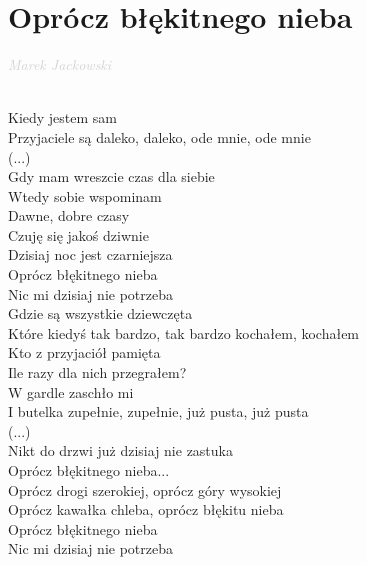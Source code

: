 \documentclass[a5paper, 10pt]{book}
\begin{document}
\section{Oprócz błękitnego nieba}\textcolor{lightgray}{\textit{Marek Jackowski}}\\~\\
\begin{minipage}[t]{0.8\textwidth}
Kiedy jestem sam\\
Przyjaciele są daleko, daleko, ode mnie, ode mnie\\
(...)~\\
Gdy mam wreszcie czas dla siebie\\

Wtedy sobie wspominam\\
Dawne, dobre czasy\\
Czuję się jakoś dziwnie\\
Dzisiaj noc jest czarniejsza\\

\hspace*{5mm}Oprócz błękitnego nieba\\
\hspace*{5mm}Nic mi dzisiaj nie potrzeba\\

Gdzie są wszystkie dziewczęta\\
Które kiedyś tak bardzo, tak bardzo kochałem, kochałem\\
Kto z przyjaciół pamięta\\ 
Ile razy dla nich przegrałem?\\

W gardle zaschło mi\\
I butelka zupełnie, zupełnie, już pusta, już pusta\\
(...)\\
Nikt do drzwi już dzisiaj nie zastuka\\

\hspace*{5mm}Oprócz błękitnego nieba...\\

\hspace*{5mm}Oprócz drogi szerokiej, oprócz góry wysokiej\\
\hspace*{5mm}Oprócz kawałka chleba, oprócz błękitu nieba\\
\hspace*{5mm}Oprócz błękitnego nieba\\
\hspace*{5mm}Nic mi dzisiaj nie potrzeba\\

\end{minipage}
\end{document}
